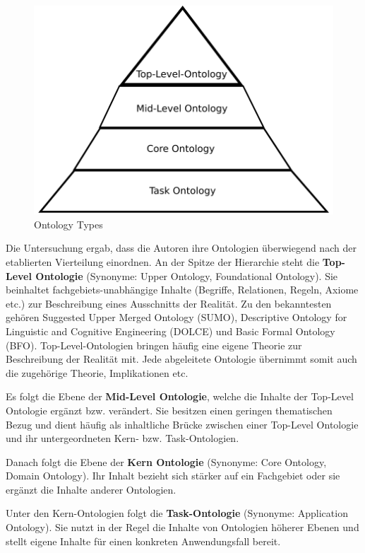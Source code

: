\documentclass{article}
\begin{document}
\begin{figure}[H]
    \includegraphics[scale=0.4]{ontology-types}
    \centering
    \caption{Ontology Types}
\end{figure}

Die Untersuchung ergab, dass die Autoren ihre Ontologien überwiegend nach der etablierten Vierteilung einordnen.
An der Spitze der Hierarchie steht die \textbf{Top-Level Ontologie} (Synonyme: Upper Ontology, Foundational Ontology).
Sie beinhaltet fachgebiets-unabhängige Inhalte (Begriffe, Relationen, Regeln, Axiome etc.) zur Beschreibung eines Ausschnitts der Realität.
Zu den bekanntesten gehören Suggested Upper Merged Ontology (SUMO), Descriptive Ontology for Linguistic and Cognitive Engineering (DOLCE) und Basic Formal Ontology (BFO).
Top-Level-Ontologien bringen häufig eine eigene Theorie zur Beschreibung der Realität mit.
Jede abgeleitete Ontologie übernimmt somit auch die zugehörige Theorie, Implikationen etc.

Es folgt die Ebene der \textbf{Mid-Level Ontologie}, welche die Inhalte der Top-Level Ontologie ergänzt bzw. verändert. Sie besitzen einen geringen thematischen Bezug und dient häufig als inhaltliche Brücke zwischen einer Top-Level Ontologie und ihr untergeordneten Kern- bzw. Task-Ontologien.

Danach folgt die Ebene der \textbf{Kern Ontologie} (Synonyme: Core Ontology, Domain Ontology).
Ihr Inhalt bezieht sich stärker auf ein Fachgebiet oder sie ergänzt die Inhalte anderer Ontologien.

Unter den Kern-Ontologien folgt die \textbf{Task-Ontologie} (Synonyme: Application Ontology).
Sie nutzt in der Regel die Inhalte von Ontologien höherer Ebenen und stellt eigene Inhalte für einen konkreten Anwendungsfall bereit.
\end{document}
